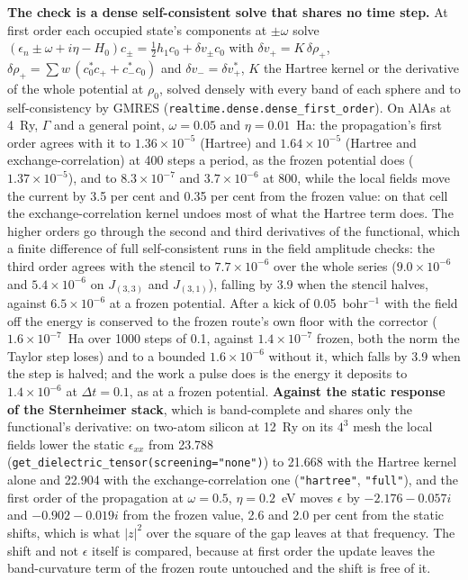 \documentclass[11pt,a4paper]{article}
\newcommand{\code}[1]{\texttt{\small #1}}
\begin{document}
\textbf{The check is a dense self-consistent solve that shares no time step.} At
first order each occupied state's components at $\pm\omega$ solve
$(\epsilon_n \pm \omega + i\eta - H_0)c_\pm = \tfrac12 h_1 c_0 + \delta v_\pm c_0$
with $\delta v_+ = K\,\delta\rho_+$,
$\delta\rho_+ = \sum w\,(c_0^* c_+ + c_-^* c_0)$ and $\delta v_- = \delta v_+^*$,
$K$ the Hartree kernel or the derivative of the whole potential at $\rho_0$,
solved densely with every band of each sphere and to self-consistency by GMRES
(\code{realtime.dense.dense\_first\_order}). On AlAs at 4~Ry, $\Gamma$ and a
general point, $\omega = 0.05$ and $\eta = 0.01$~Ha: the propagation's first order
agrees with it to $1.36\times10^{-5}$ (Hartree) and $1.64\times10^{-5}$ (Hartree and
exchange-correlation) at 400 steps a period, as the frozen potential does
($1.37\times10^{-5}$), and to $8.3\times10^{-7}$ and $3.7\times10^{-6}$ at 800,
while the local fields move the current by 3.5 per cent and 0.35 per cent from
the frozen value: on that cell the exchange-correlation kernel undoes most of
what the Hartree term does. The higher orders go through the second and third
derivatives of the functional, which a finite difference of full self-consistent
runs in the field amplitude checks: the third order agrees with the stencil to
$7.7\times10^{-6}$ over the whole series ($9.0\times10^{-6}$ and $5.4\times10^{-6}$ on
$J_{(3,3)}$ and $J_{(3,1)}$), falling by 3.9 when the stencil halves, against
$6.5\times10^{-6}$ at a frozen potential. After a kick of 0.05~bohr$^{-1}$ with the field off the energy is
conserved to the frozen route's own floor with the corrector
($1.6\times10^{-7}$~Ha over 1000 steps of 0.1, against $1.4\times10^{-7}$ frozen,
both the norm the Taylor step loses) and to a bounded $1.6\times10^{-6}$ without
it, which falls by 3.9 when the step is halved; and the work a pulse does is the
energy it deposits to $1.4\times10^{-6}$ at $\Delta t = 0.1$, as at a frozen
potential. \textbf{Against the static response of the Sternheimer stack}, which
is band-complete and shares only the functional's derivative: on two-atom
silicon at 12~Ry on its $4^3$ mesh the local fields lower the static
$\epsilon_{xx}$ from 23.788 (\code{get\_dielectric\_tensor(screening="none")}) to
21.668 with the Hartree kernel alone and 22.904 with the exchange-correlation one
(\code{"hartree"}, \code{"full"}), and the first order of the propagation at
$\omega = 0.5$, $\eta = 0.2$~eV moves $\epsilon$ by $-2.176-0.057i$ and
$-0.902-0.019i$ from the frozen value, 2.6 and 2.0 per cent from the static shifts,
which is what $|z|^2$ over the square of the gap leaves at that frequency. The
shift and not $\epsilon$ itself is compared, because at first order the update
leaves the band-curvature term of the frozen route untouched and the shift is free
of it.
\end{document}
